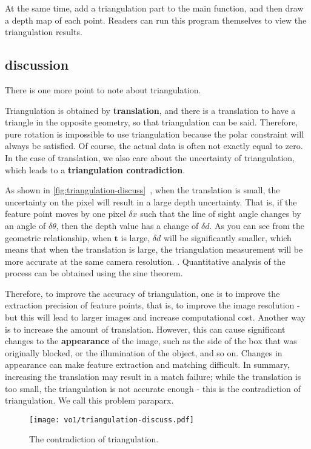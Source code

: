 At the same time, add a triangulation part to the main function, and then draw a depth map of each point. Readers can run this program themselves to view the triangulation results.

\subsection{discussion}
There is one more point to note about triangulation.

Triangulation is obtained by \textbf{translation}, and there is a translation to have a triangle in the opposite geometry, so that triangulation can be said. Therefore, pure rotation is impossible to use triangulation because the polar constraint will always be satisfied. Of course, the actual data is often not exactly equal to zero. In the case of translation, we also care about the uncertainty of triangulation, which leads to a \textbf{triangulation contradiction}.

As shown in \autoref{fig:triangulation-discuss}~, when the translation is small, the uncertainty on the pixel will result in a large depth uncertainty. That is, if the feature point moves by one pixel $\delta x$ such that the line of sight angle changes by an angle of $\delta \theta$, then the depth value has a change of $\delta d$. As you can see from the geometric relationship, when $\bm{t}$ is large, $\delta d$ will be significantly smaller, which means that when the translation is large, the triangulation measurement will be more accurate at the same camera resolution. . Quantitative analysis of the process can be obtained using the sine theorem.

Therefore, to improve the accuracy of triangulation, one is to improve the extraction precision of feature points, that is, to improve the image resolution - but this will lead to larger images and increase computational cost. Another way is to increase the amount of translation. However, this can cause significant changes to the \textbf{appearance} of the image, such as the side of the box that was originally blocked, or the illumination of the object, and so on. Changes in appearance can make feature extraction and matching difficult. In summary, increasing the translation may result in a match failure; while the translation is too small, the triangulation is not accurate enough - this is the contradiction of triangulation. We call this problem paraparx.

\begin{figure}[!ht]
\centering
\texttt{[image: vo1/triangulation-discuss.pdf]}
\caption{The contradiction of triangulation. }
\label{fig:triangulation-discuss}
\end{figure}

